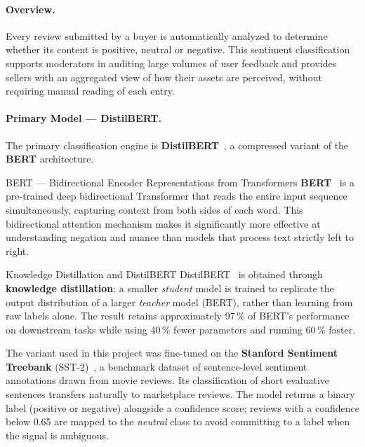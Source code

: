 \paragraph{Overview.}
Every review submitted by a buyer is automatically analyzed to determine whether its content is positive, neutral or negative. This sentiment classification supports moderators in auditing large volumes of user feedback and provides sellers with an aggregated view of how their assets are perceived, without requiring manual reading of each entry.

\paragraph{Primary Model --- DistilBERT.}
The primary classification engine is \textbf{DistilBERT}~\cite{distilbert}, a compressed variant of the \textbf{BERT} architecture.

\vspace{4pt}
\begin{conceptbox}[aiBlue]{BERT --- Bidirectional Encoder Representations from Transformers}
\textbf{BERT}~\cite{bert} is a pre-trained deep bidirectional Transformer that reads the entire input sequence simultaneously, capturing context from both sides of each word. This bidirectional attention mechanism makes it significantly more effective at understanding negation and nuance than models that process text strictly left to right.
\end{conceptbox}

\vspace{4pt}
\begin{conceptbox}[aiGreen]{Knowledge Distillation and DistilBERT}
DistilBERT~\cite{distilbert} is obtained through \textbf{knowledge distillation}: a smaller \textit{student} model is trained to replicate the output distribution of a larger \textit{teacher} model (BERT), rather than learning from raw labels alone. The result retains approximately 97\,\% of BERT's performance on downstream tasks while using 40\,\% fewer parameters and running 60\,\% faster.
\end{conceptbox}

The variant used in this project was fine-tuned on the \textbf{Stanford Sentiment Treebank} (SST-2)~\cite{sst2}, a benchmark dataset of sentence-level sentiment annotations drawn from movie reviews. Its classification of short evaluative sentences transfers naturally to marketplace reviews. The model returns a binary label (positive or negative) alongside a confidence score; reviews with a confidence below 0.65 are mapped to the \textit{neutral} class to avoid committing to a label when the signal is ambiguous.

